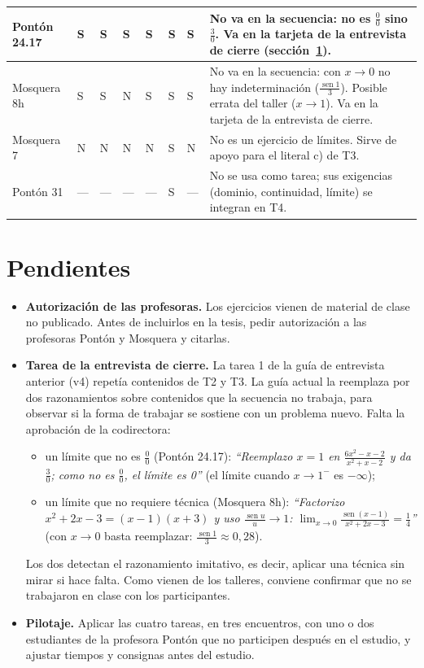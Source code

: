 \documentclass[11pt,letterpaper]{article}
\DeclareMathOperator{\seno}{sen}
\begin{document}
\begin{center}
\begin{tabularx}{\linewidth}{|p{2.5cm}|Y|Y|Y|Y|Y|Y|L|}
Pontón 24.17 & S & S & S & S & S & S & No va en la secuencia: no es $\frac00$ sino $\frac30$. Va en la tarjeta de la entrevista de cierre (sección~\ref{sec:pendientes}). \\ \hline
Mosquera 8h & S & S & N & S & S & S & No va en la secuencia: con $x\to0$ no hay indeterminación ($\frac{\seno 1}{3}$). Posible errata del taller ($x\to1$). Va en la tarjeta de la entrevista de cierre. \\ \hline
Mosquera 7 & N & N & N & N & S & N & No es un ejercicio de límites. Sirve de apoyo para el literal c) de T3. \\ \hline
Pontón 31 & --- & --- & --- & --- & S & --- & No se usa como tarea; sus exigencias (dominio, continuidad, límite) se integran en T4. \\ \hline
\end{tabularx}
\end{center}

\section{Pendientes}
\label{sec:pendientes}

\begin{itemize}
  \item \textbf{Autorización de las profesoras.} Los ejercicios vienen de material de clase no publicado. Antes de incluirlos en la tesis, pedir autorización a las profesoras Pontón y Mosquera y citarlas.
  \item \textbf{Tarea de la entrevista de cierre.} La tarea 1 de la guía de entrevista anterior (v4) repetía contenidos de T2 y T3. La guía actual la reemplaza por dos razonamientos sobre contenidos que la secuencia no trabaja, para observar si la forma de trabajar se sostiene con un problema nuevo. Falta la aprobación de la codirectora:
  \begin{itemize}
    \item un límite que no es $\frac00$ (Pontón 24.17): \emph{``Reemplazo $x=1$ en $\frac{6x^2-x-2}{x^2+x-2}$ y da $\frac30$; como no es $\frac00$, el límite es 0''} (el límite cuando $x\to1^-$ es $-\infty$);
    \item un límite que no requiere técnica (Mosquera 8h): \emph{``Factorizo $x^2+2x-3=(x-1)(x+3)$ y uso $\frac{\seno u}{u}\to1$: $\lim_{x\to0}\frac{\seno(x-1)}{x^2+2x-3}=\frac14$''} (con $x\to0$ basta reemplazar: $\frac{\seno 1}{3}\approx0{,}28$).
  \end{itemize}
  Los dos detectan el razonamiento imitativo, es decir, aplicar una técnica sin mirar si hace falta. Como vienen de los talleres, conviene confirmar que no se trabajaron en clase con los participantes.
  \item \textbf{Pilotaje.} Aplicar las cuatro tareas, en tres encuentros, con uno o dos estudiantes de la profesora Pontón que no participen después en el estudio, y ajustar tiempos y consignas antes del estudio.
\end{itemize}
\end{document}

